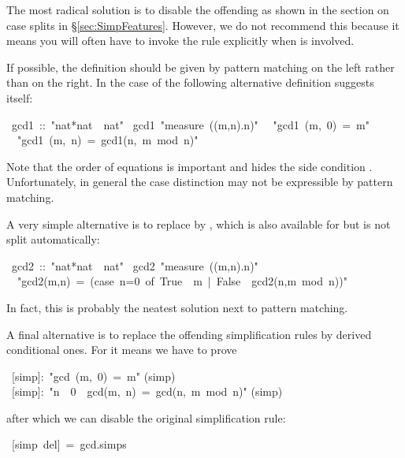 \begin{isabelle}
\begin{isamarkuptext}
The most radical solution is to disable the offending
 as shown in the section on case splits in
\S\ref{sec:SimpFeatures}.
However, we do not recommend this because it means you will often have to
invoke the rule explicitly when  is involved.

If possible, the definition should be given by pattern matching on the left
rather than  on the right. In the case of  the
following alternative definition suggests itself:%
\end{isamarkuptext}%
~gcd1~::~{"}nat*nat~{\isasymRightarrow}~nat{"}\isanewline
{}~gcd1~{"}measure~({\isasymlambda}(m,n).n){"}\isanewline
~~{"}gcd1~(m,~0)~=~m{"}\isanewline
~~{"}gcd1~(m,~n)~=~gcd1(n,~m~mod~n){"}%
\begin{isamarkuptext}%
\noindent
Note that the order of equations is important and hides the side condition
. Unfortunately, in general the case distinction
may not be expressible by pattern matching.

A very simple alternative is to replace  by , which
is also available for  but is not split automatically:%
\end{isamarkuptext}%
~gcd2~::~{"}nat*nat~{\isasymRightarrow}~nat{"}\isanewline
{}~gcd2~{"}measure~({\isasymlambda}(m,n).n){"}\isanewline
~~{"}gcd2(m,n)~=~(case~n=0~of~True~{\isasymRightarrow}~m~|~False~{\isasymRightarrow}~gcd2(n,m~mod~n)){"}%
\begin{isamarkuptext}%
\noindent
In fact, this is probably the neatest solution next to pattern matching.

A final alternative is to replace the offending simplification rules by
derived conditional ones. For  it means we have to prove%
\end{isamarkuptext}%
~[simp]:~{"}gcd~(m,~0)~=~m{"}\isanewline
{}(simp)\isanewline
{}~[simp]:~{"}n~{\isasymnoteq}~0~{\isasymLongrightarrow}~gcd(m,~n)~=~gcd(n,~m~mod~n){"}\isanewline
{}(simp)%
\begin{isamarkuptext}%
\noindent
after which we can disable the original simplification rule:%
\end{isamarkuptext}%
~[simp~del]~=~gcd.simps\isanewline
\end{isabelle}%
